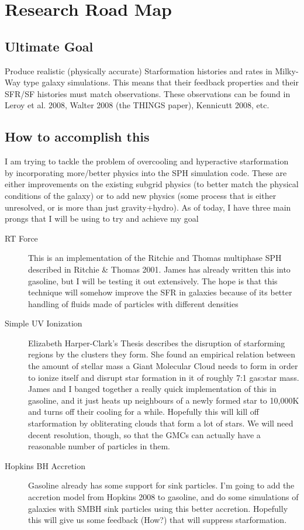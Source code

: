 \documentclass[11pt,letterpaper]{article}
\begin{document}
\section*{Research Road Map}
\subsection*{Ultimate Goal}
Produce realistic (physically accurate) Starformation histories and rates in
Milky-Way type galaxy simulations.  This means that their feedback properties
and their SFR/SF histories must match observations.  These observations can
be found in Leroy et al. 2008,  Walter 2008 (the THINGS paper), Kennicutt 2008, etc.
\subsection*{How to accomplish this}
I am trying to tackle the problem of overcooling and hyperactive starformation
by incorporating more/better physics into the SPH simulation code.  These are 
either improvements on the existing subgrid physics (to better match the 
physical conditions of the galaxy) or to add new physics (some process that is
either unresolved, or is more than just gravity+hydro).  As of today, I have
three main prongs that I will be using to try and achieve my goal
\begin{description}
\item[RT Force] This is an implementation of the Ritchie and Thomas multiphase
SPH described in Ritchie \& Thomas 2001.  James has already written this into
gasoline, but I will be testing it out extensively.  The hope is that this
technique will somehow improve the SFR in galaxies because of its better 
handling of fluids made of particles with different densities
\item[Simple UV Ionization] Elizabeth Harper-Clark's Thesis describes the 
disruption of starforming regions by the clusters they form.  She found an 
empirical relation between the amount of stellar mass a Giant Molecular Cloud
needs to form in order to ionize itself and disrupt star formation in it of 
roughly 7:1 gas:star mass.  James and I banged together a really quick 
implementation of this in gasoline, and it just heats up neighbours of a newly
formed star to 10,000K and turns off their cooling for a while.  Hopefully this
will kill off starformation by obliterating clouds that form a lot of stars.
We will need decent resolution, though, so that the GMCs can actually have
a reasonable number of particles in them.
\item[Hopkins BH Accretion] Gasoline already has some support for sink 
particles.  I'm going to add the accretion model from Hopkins 2008 to gasoline,
and do some simulations of galaxies with SMBH sink particles using this better
accretion.  Hopefully this will give us some feedback (How?) that will suppress
starformation.
\end{description}
\end{document}

